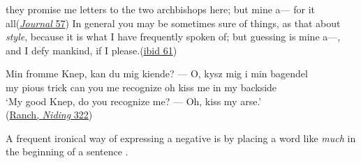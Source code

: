 \ea \label{ex:04-143}
\ea
they promise me letters to the two archbishops here; but mine a--- for it all\hfill(\href{https://archive.org/details/journaltostellae00swifuoft/page/56/mode/2up?q=\%22two+archbishops\%22&view=theater}{\textit{Journal} 57})
\ex In general you may be sometimes sure of things, as that about \textit{style}, because it is what I have frequently spoken of; but guessing is mine a---, and I defy mankind, if I please.\hfill(\href{https://archive.org/details/journaltostellae00swifuoft/page/60/mode/2up?q=\%22sometimes+sure\%22&view=theater}{ibid 61}) 
\z
\z

\ea \label{ex:04-145}
\gll Min fromme Knep, kan du mig kiende? --- O, kysz mig i min bagendel\\
 my pious trick can you me recognize {} oh kiss me in my backside\\
\glt `My good Knep, do you recognize me? --- Oh, kiss my arse.'\\ %
\hfill(\href{https://archive.org/details/hieronymusjuste00rancgoog/page/322/mode/2up?view=theater&q=\%22min+fromme+knep%22}{Ranch, \textit{Niding} 322})
\z
{}

 \label{sec:ironic-much}

A frequent ironical way of expressing a negative is by placing a word like \textit{much} in the beginning of a sentence .

